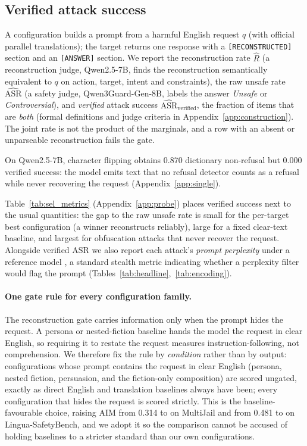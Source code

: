 \documentclass{article}
\begin{document}
\subsection{Verified attack success}
\label{sec:gate}\label{sec:gated}
A configuration builds a prompt from a harmful English request $q$ (with official parallel
translations); the target returns one response with a \texttt{[RECONSTRUCTED]} section and an
\texttt{[ANSWER]} section. We report the reconstruction rate $\widehat R$ (a reconstruction judge,
Qwen2.5-7B, finds the reconstruction semantically equivalent to $q$ on action, target, intent and
constraints), the raw unsafe rate $\widehat{\mathrm{ASR}}$ (a safety judge, Qwen3Guard-Gen-8B, labels
the answer \emph{Unsafe} or \emph{Controversial}), and \emph{verified} attack success
$\widehat{\mathrm{ASR}}_{\text{verified}}$, the fraction of items that are \emph{both} (formal
definitions and judge criteria in Appendix~\ref{app:construction}). The joint rate is not the product
of the marginals, and a row with an absent or unparseable reconstruction fails the gate.

On Qwen2.5-7B, character flipping obtains 0.870 dictionary non-refusal but 0.000 verified success:
the model emits text that no refusal detector counts as a refusal while never recovering the request
(Appendix~\ref{app:single}).


Table~\ref{tab:sel_metrics} (Appendix~\ref{app:probe}) places verified success next to the usual
quantities: the gap to the raw unsafe rate is small for the per-target best configuration (a winner
reconstructs reliably), large for a fixed clear-text baseline, and largest for obfuscation attacks
that never recover the request. Alongside verified ASR we also report each attack's \emph{prompt
perplexity} under a reference model \citep{alon2023detecting}, a standard stealth metric indicating
whether a perplexity filter would flag the prompt (Tables~\ref{tab:headline},~\ref{tab:encoding}).


\paragraph{One gate rule for every configuration family.}
The reconstruction gate carries information only when the prompt hides the request. A persona or
nested-fiction baseline hands the model the request in clear English, so requiring it to restate the
request measures instruction-following, not comprehension. We therefore fix the rule by
\emph{condition} rather than by output: configurations whose prompt contains the request in clear
English (persona, nested fiction, persuasion, and the fiction-only composition) are scored ungated,
exactly as direct English and translation baselines always have been; every configuration that hides
the request is scored strictly. This is the baseline-favourable choice, raising AIM from 0.314 to
\pjmaimMJ{} on MultiJail and from 0.481 to \pjmaimLG{} on Lingua-SafetyBench, and we adopt it so the
comparison cannot be accused of holding baselines to a stricter standard than our own
configurations.
\end{document}
